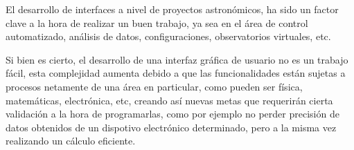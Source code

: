 El desarrollo de interfaces a nivel de proyectos astronómicos,
ha sido un factor clave a la hora de realizar un buen trabajo,
ya sea en el área de control automatizado, análisis de datos,
configuraciones, observatorios virtuales, etc.

Si bien es cierto, el desarrollo de una interfaz gráfica de usuario
no es un trabajo fácil, esta complejidad aumenta debido a que las
funcionalidades están sujetas a procesos netamente de una área
en particular, como pueden ser física, matemáticas, electrónica,
etc, creando así nuevas metas que requerirán cierta validación
a la hora de programarlas, como por ejemplo no perder precisión
de datos obtenidos de un dispotivo electrónico determinado,
pero a la misma vez realizando un cálculo eficiente.

